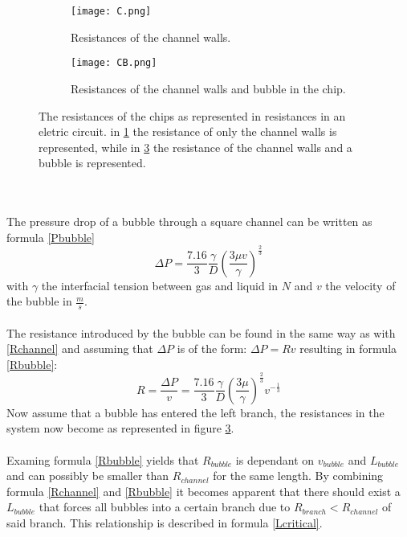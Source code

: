 \begin{figure}
\centering
\begin{subfigure}{0.45\textwidth}
\centering
\texttt{[image: C.png]}
\caption{Resistances of the channel walls.}
\label{subfig:C}
\end{subfigure}
\begin{subfigure}{0.45\textwidth}
\centering
\texttt{[image: CB.png]}
\caption{Resistances of the channel walls and bubble in the chip.}
\label{subfig:CB}
\end{subfigure}
\caption{The resistances of the chips as represented in resistances in an eletric circuit. in \ref{subfig:C} the resistance of only the channel walls is represented, while in \ref{subfig:CB} the resistance of the channel walls and a bubble is represented. \cite{handout}}
\end{figure}
\\
\\
The pressure drop of a bubble through a square channel can be written as formula \ref{Pbubble} 
\begin{equation}
\Delta P = \frac{7.16}{3} \frac{\gamma}{D} \left(\frac {3\mu v}{\gamma}\right)^\frac{2}{3}
\label{Pbubble}
\end{equation} 
with $\gamma$ the interfacial tension between gas and liquid in $N$ and $v$ the velocity of the bubble in $\frac{m}{s}$.\\
\\
The resistance introduced by the bubble can be found in the same way as with \ref{Rchannel} and assuming that $\Delta P$ is of the form: $\Delta P = R v$  resulting in formula \ref{Rbubble}:
\begin{equation}
R = \frac{\Delta P}{v} = \frac{7.16}{3} \frac{\gamma}{D} \left(\frac{3 \mu}{\gamma}\right)^\frac{2}{3} v^{-\frac{1}{3}}
\label{Rbubble}
\end{equation}
Now assume that a bubble has entered the left branch, the resistances in the system now become as represented in figure \ref{subfig:CB}.\\
\\
Examing formula \ref{Rbubble} yields that $R_{bubble}$ is dependant on $v_{bubble}$ and $L_{bubble}$ and can possibly be smaller than $R_{channel}$ for the same length.  By combining formula \ref{Rchannel} and \ref{Rbubble} it becomes apparent that there should exist a $L_{bubble}$ that forces all bubbles into a certain branch due to $R_{branch} < R_{channel}$ of said branch. This relationship is described in formula \ref{Lcritical}.
